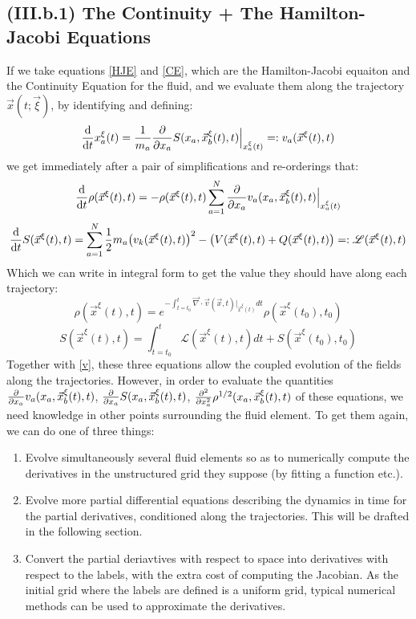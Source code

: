 \documentclass[11pt, a4paper]{article} %
\newcommand{\Lg}{\mathscr{L}}
\begin{document}
\subsection*{(III.b.1) The Continuity + The Hamilton-Jacobi Equations}

If we take equations \eqref{HJE} and \eqref{CE}, which are the Hamilton-Jacobi equaiton and the Continuity Equation for the fluid, and we evaluate them along the trajectory $\vec{x}(t;\vec{\xi})$, by identifying and defining:
\begin{equation}\label{v}
\dv{}{t}x_a^\xi(t)=\frac{1}{m_a}\pdv{}{x_a}S(x_a, \vec{x}_b^\xi(t),t)\Big\rvert_{x^\xi_a(t)}=:v_a(\vec{x}^\xi(t),t)
\end{equation}
we get immediately after a pair of simplifications and re-orderings that:
\begin{equation}\label{CE.L}
\dv{}{t}\rho(\vec{x}^\xi(t),t)=-\rho(\vec{x}^\xi(t),t)\sum_{a=1}^N\pdv{}{x_a} v_a(x_a, \vec{x}_b^\xi(t),t)\Big\rvert_{x_a^\xi(t)}
\end{equation}
\begin{equation}\label{HJE.L}
\dv{}{t}S(\vec{x}^\xi(t),t)=  \sum_{a=1}^N \frac{1}{2} m_a \qty(v_k(\vec{x}^\xi(t),t) )^2 - \qty(V(\vec{x}^\xi(t),t)+ Q(\vec{x}^\xi(t),t))=: \Lg(\vec{x}^\xi(t),t)
\end{equation}
Which we can write in integral form to get the value they should have along each trajectory:
\begin{equation}\label{JacPre}
\rho(\vec{x}^\xi(t),t)=e^{-\int_{t=t_0}^t \vec{\nabla}\cdot \vec{v}(\vec{x},t)\rvert_{\vec{x}^\xi(t)} dt}\rho(\vec{x}^\xi(t_0),t_0)
\end{equation}
\begin{equation}
S(\vec{x}^\xi(t),t)=\int_{t=t_0}^t \Lg(\vec{x}^\xi(t),t) dt+S(\vec{x}^\xi(t_0),t_0)
\end{equation}
Together with \eqref{v}, these three equations allow the coupled evolution of the fields along the trajectories. However, in order to evaluate the quantities $\pdv{}{x_a} v_a(x_a, \vec{x}_b^\xi(t),t)$, $\pdv{}{x_a}S(x_a, \vec{x}_b^\xi(t),t)$, $\pdv[2]{}{x_a}\rho^{1/2}(x_a, \vec{x}_b^\xi(t),t)$ of these equations, we need knowledge in other points surrounding the fluid element. To get them again, we can do one of three things:
\begin{enumerate}
\item Evolve simultaneously several fluid elements so as to numerically compute the derivatives in the unstructured grid they suppose (by fitting a function etc.).
\item Evolve more partial differential equations describing the dynamics in time for the partial derivatives, conditioned along the trajectories. This will be drafted in the following section.
\item Convert the partial deriavtives with respect to space into derivatives with respect to the labels, with the extra cost of computing the Jacobian. As the initial grid where the labels are defined is a uniform grid, typical numerical methods can be used to approximate the derivatives. 
\end{enumerate}
\end{document}

